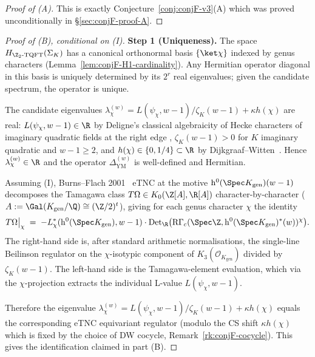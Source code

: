 \begin{proof}[Proof of (A)]
This is exactly Conjecture~\ref{conj:conjF-v3}(A) which was proved
unconditionally in \S\ref{sec:conjF-proof-A}.
\end{proof}

\begin{proof}[Proof of (B), conditional on (I)]
{\bf Step 1 (Uniqueness).}  The space
$H_{\Z_2\text{-}\mathrm{TQFT}}(\Sigma_K)$ has a canonical orthonormal
basis $\{\ket\chi\}$ indexed by genus characters
(Lemma~\ref{lem:conjF-H1-cardinality}).  Any Hermitian operator
diagonal in this basis is uniquely determined by its $2^r$ real
eigenvalues; given the candidate spectrum, the operator is unique.

  The candidate
eigenvalues
$\lambda_\chi^{(w)} = L(\psi_\chi, w-1)/\zeta_K(w-1) + \kappa h(\chi)$
are real: $L(\psi_\chi, w-1) \in \R$ by Deligne's classical
algebraicity of Hecke characters of imaginary quadratic fields at the
right edge \cite{Deligne1979}, $\zeta_K(w-1) > 0$ for $K$ imaginary
quadratic and $w - 1 \ge 2$, and $h(\chi) \in \{0, 1/4\} \subset \R$
by Dijkgraaf--Witten~\cite{DijkgraafWitten1990}.  Hence
$\lambda_\chi^{(w)} \in \R$ and the operator $\Delta_{\mathrm{YM}}^{(w)}$
is well-defined and Hermitian.

  Assuming (I), Burns--Flach
2001~\cite{BurnsFlach2001Doc} eTNC at the motive
$\mathrm{h}^0(\Spec K_{\mathrm{gen}})(w-1)$ decomposes the Tamagawa
class $T\Omega \in K_0(\Z[A], \R[A])$ character-by-character
($A := \Gal(K_{\mathrm{gen}}/\Q) \cong (\Z/2)^t$), giving for each
genus character $\chi$ the identity
\[
T\Omega \big|_\chi \;=\; -L_\chi^*(\mathrm{h}^0(\Spec K_{\mathrm{gen}}), w-1)
\cdot \mathrm{Det}_\R\bigl(\mathrm{R}\Gamma_c(\Spec\Z, \mathrm{h}^0(\Spec K_{\mathrm{gen}})^*(w))^\chi\bigr).
\]
The right-hand side is, after standard arithmetic normalisations, the
single-line Beilinson regulator on the $\chi$-isotypic component of
$K_3(\mathcal{O}_{K_{\mathrm{gen}}})$ divided by $\zeta_K(w-1)$.  The
left-hand side is the Tamagawa-element evaluation, which via the
$\chi$-projection extracts the individual L-value $L(\psi_\chi, w-1)$.

Therefore the eigenvalue $\lambda_\chi^{(w)} = L(\psi_\chi, w-1)/\zeta_K(w-1)
+ \kappa h(\chi)$ equals the corresponding eTNC equivariant regulator
(modulo the CS shift $\kappa h(\chi)$ which is fixed by the choice of
DW cocycle, Remark~\ref{rk:conjF-cocycle}).  This gives the
identification claimed in part (B).
\end{proof}

